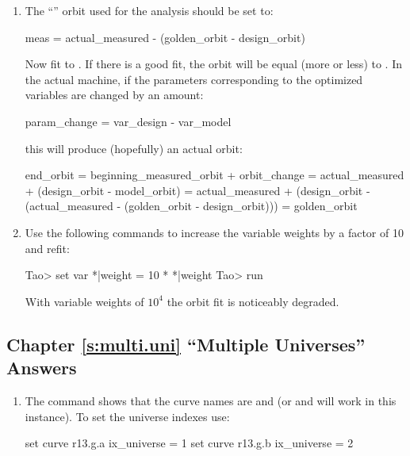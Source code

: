 \documentclass{hitec}     %
\begin{document}
\begin{enumerate}[label=\ref*{s:opt.cor}.\arabic{enumi}]
\item
The ``'' orbit used for the analysis should be set to:
\begin{code}
meas = actual_measured - (golden_orbit - design_orbit)
\end{code}
Now fit to . If there is a good fit, the  orbit will be equal (more or
less) to . In the actual machine, if the parameters corresponding to the optimized
variables are changed by an amount:
\begin{code}
param_change = var_design - var_model
\end{code}
this will produce (hopefully) an actual orbit:
\begin{code}
end_orbit = beginning_measured_orbit + orbit_change
          = actual_measured + (design_orbit - model_orbit)
          = actual_measured + (design_orbit - 
                     (actual_measured - (golden_orbit - design_orbit)))
          = golden_orbit
\end{code}
%
\item
Use the following commands to increase the variable weights by a factor of 10 and refit:
\begin{code}
Tao> set var *|weight = 10 * *|weight
Tao> run
\end{code}
With variable weights of $10^4$ the orbit fit is noticeably degraded.
\end{enumerate}

\subsection[Chapter \ref*{s:multi.uni.ex} ``Multiple Universes'']{Chapter \hyperref[s:multi.uni.ex]{\ref*{s:multi.uni}} ``Multiple Universes'' Answers}
\label{s:ans.uni}

\begin{enumerate}[label=\ref*{s:multi.uni}.\arabic{enumi}]
\item
The  command shows that the curve names are  and  (or
 and  will work in this instance). To set the universe indexes use:
\begin{code}
set curve r13.g.a ix_universe = 1
set curve r13.g.b ix_universe = 2
\end{code}
\end{enumerate}
\end{document}
